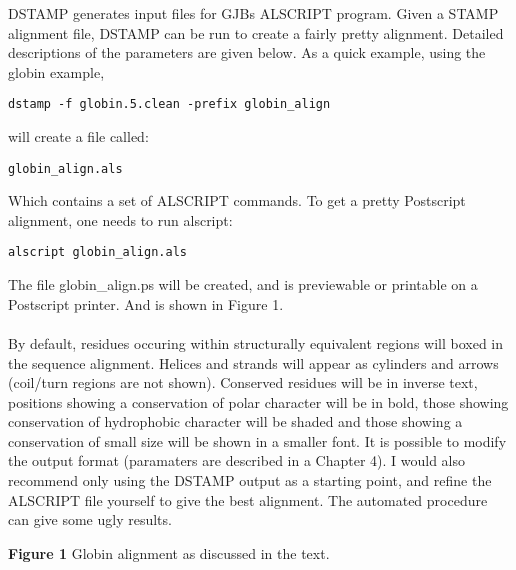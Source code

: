 DSTAMP generates input files for GJBs ALSCRIPT program.  Given a STAMP 
alignment file, DSTAMP can be run to create a fairly pretty alignment.
Detailed descriptions of the parameters are given below.  As a quick 
example, using the globin example,\\

\begin{scriptsize}\begin{verbatim}
dstamp -f globin.5.clean -prefix globin_align
\end{verbatim} \end{scriptsize}

will create a file called:

\begin{scriptsize}\begin{verbatim}
globin_align.als
\end{verbatim} \end{scriptsize}

Which contains a set of ALSCRIPT commands.  To get a pretty Postscript alignment, one needs to
run alscript:\\

\begin{scriptsize}\begin{verbatim}
alscript globin_align.als
\end{verbatim} \end{scriptsize}

The file globin\_align.ps will be created, and is previewable or 
printable on a Postscript printer.  And is shown in Figure 1.\\
\\
By default, residues occuring within
structurally equivalent regions will boxed in the sequence alignment.
Helices and strands will appear as cylinders and arrows (coil/turn regions
are not shown).  Conserved residues will be in inverse text, positions
showing a conservation of polar character will be in bold, those showing
conservation of hydrophobic character will be shaded and those showing
a conservation of small size will be shown in a smaller font.
It is possible to modify the output format (paramaters are described in a Chapter 4).
I would also recommend only using the DSTAMP output as a starting point, and
refine the ALSCRIPT file yourself to give the best alignment.  The automated
procedure can give some ugly results.

\vspace*{3.5in}
\noindent
\begin{scriptsize}
{\bf Figure 1} Globin alignment as discussed in the text.
\end{scriptsize}

